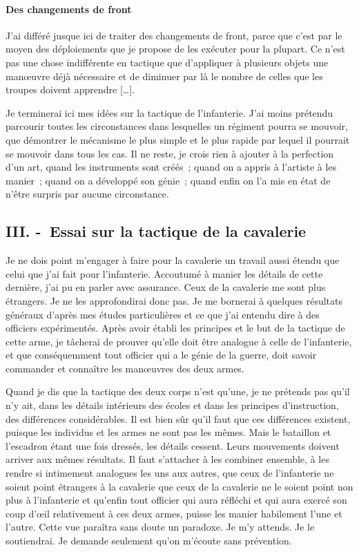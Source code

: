 \documentclass[french,twoside]{book} %
\begin{document}
\paragraph[{Des changements de front}]{Des changements de front}
\noindent J’ai différé jusque ici de traiter des changements de front, parce que c’est par le moyen des déploiements que je propose de les exécuter pour la plupart. Ce n’est pas une chose indifférente en tactique que d’appliquer à plusieurs objets une manœuvre déjà nécessaire et de diminuer par là le nombre de celles que les troupes doivent apprendre […].\par
Je terminerai ici mes idées sur la tactique de l’infanterie. J’ai moins prétendu parcourir toutes les circonstances dans lesquelles un régiment pourra se mouvoir, que démontrer le mécanisme le plus simple et le plus rapide par lequel il pourrait se mouvoir dans tous les cas. Il ne reste, je crois rien à ajouter à la perfection d’un art, quand les instruments sont créés ; quand on a appris à l’artiste à les manier ; quand on a développé son génie ; quand enfin on l’a mis en état de n’être surpris par aucune circonstance.
\subsection[{III. - Essai sur la tactique de la cavalerie}]{III. - Essai sur la tactique de la cavalerie}
\noindent Je ne dois point m’engager à faire pour la cavalerie un travail aussi étendu que celui que j’ai fait pour l’infanterie. Accoutumé à manier les détails de cette dernière, j’ai pu en parler avec assurance. Ceux de la cavalerie me sont plus étrangers. Je ne les approfondirai donc pas. Je me bornerai à quelques résultats généraux d’après mes études particulières et ce que j’ai entendu dire à des officiers expérimentés. Après avoir établi les principes et le but de la tactique de cette arme, je tâcherai de prouver qu’elle doit être analogue à celle de l’infanterie, et que conséquemment tout officier qui a le génie de la guerre, doit savoir commander et connaître les manœuvres des deux armes.\par
Quand je dis que la tactique des deux corps n’est qu’une, je ne prétends pas qu’il n’y ait, dans les détails intérieurs des écoles et dans les principes d’instruction, des différences considérables. Il est bien sûr qu’il faut que ces différences existent, puisque les individus et les armes ne sont pas les mêmes. Mais le bataillon et l’escadron étant une fois dressés, les détails cessent. Leurs mouvements doivent arriver aux mêmes résultats. Il faut s’attacher à les combiner ensemble, à les rendre si intimement analogues les uns aux autres, que ceux de l’infanterie ne soient point étrangers à la cavalerie que ceux de la cavalerie ne le soient point non plus à l’infanterie et qu’enfin tout officier qui aura réfléchi et qui aura exercé son coup d’œil relativement à ces deux armes, puisse les manier habilement l’une et l’autre. Cette vue paraîtra sans doute un paradoxe. Je m’y attends. Je le soutiendrai. Je demande seulement qu’on m’écoute sans prévention.\par
\end{document}
